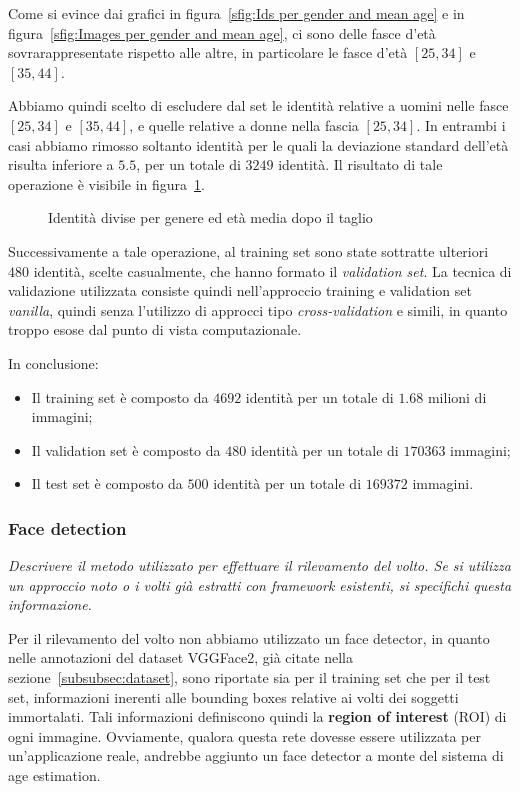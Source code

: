 Come si evince dai grafici in figura~\ref{sfig:Ids per gender and mean age} e in figura~\ref{sfig:Images per gender and mean age}, ci sono delle fasce d'età sovrarappresentate rispetto alle altre, in particolare le fasce d'età $[25,34]$ e $[35,44]$.

Abbiamo quindi scelto di escludere dal set le identità relative a uomini nelle fasce $[25,34]$ e $[35,44]$, e quelle relative a donne nella fascia $[25,34]$. In entrambi i casi abbiamo rimosso soltanto identità per le quali la deviazione standard dell'età risulta inferiore a $5.5$, per un totale di $3249$ identità. Il risultato di tale operazione è visibile in figura~\ref{fig:Ids per gender and mean age after the drop}.

\begin{figure}[ht]
\centering
\def\svgscale{0.7}

\caption{Identità divise per genere ed età media dopo il taglio}
\label{fig:Ids per gender and mean age after the drop}
\end{figure}

Successivamente a tale operazione, al training set sono state sottratte ulteriori $480$ identità, scelte casualmente, che hanno formato il \emph{validation set}. La tecnica di validazione utilizzata consiste quindi nell'approccio training e validation set \emph{vanilla}, quindi senza l'utilizzo di approcci tipo \emph{cross-validation} e simili, in quanto troppo esose dal punto di vista computazionale.

In conclusione:
\begin{itemize}
	\item Il training set è composto da $4692$ identità per un totale di $1.68$ milioni di immagini;
	\item Il validation set è composto da $480$ identità per un totale di $170363$ immagini;
	\item Il test set è composto da $500$ identità per un totale di $169372$ immagini.
\end{itemize}
\subsubsection{Face detection}
\label{subsubsec:face_detection}

\emph{Descrivere il metodo utilizzato per effettuare il rilevamento del volto. Se si utilizza un approccio noto o i volti già estratti con framework esistenti, si specifichi questa informazione.}

Per il rilevamento del volto non abbiamo utilizzato un face detector, in quanto nelle annotazioni del dataset VGGFace2, già citate nella sezione~\ref{subsubsec:dataset}, sono riportate sia per il training set che per il test set, informazioni inerenti alle bounding boxes relative ai volti dei soggetti immortalati. Tali informazioni definiscono quindi la \textbf{region of interest} (ROI) di ogni immagine.
Ovviamente, qualora questa rete dovesse essere utilizzata per un'applicazione reale, andrebbe aggiunto un face detector a monte del sistema di age estimation.

